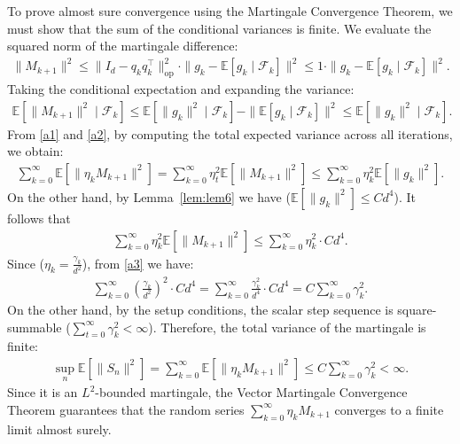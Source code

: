 \documentclass[11pt,a4paper]{article}
\theoremstyle{definition}
\begin{document}
To prove almost sure convergence using the Martingale Convergence Theorem, we must show that the sum of the conditional variances is finite. We evaluate the squared norm of the martingale difference:
\begin{align}
\|M_{k+1}\|^2 \le \|I_d - q_k q_k^\top\|_{\text{op}}^2 \cdot \|g_k - \mathbb{E}[g_k \mid \mathcal{F}_k]\|^2 \le 1 \cdot \|g_k - \mathbb{E}[g_k \mid \mathcal{F}_k]\|^2 \label{a1}.
\end{align}
Taking the conditional expectation and expanding the variance:
\begin{align}
\mathbb{E}[\|M_{k+1}\|^2 \mid \mathcal{F}_k] \le \mathbb{E}[\|g_k\|^2 \mid \mathcal{F}_k] - \|\mathbb{E}[g_k \mid \mathcal{F}_k]\|^2 \le \mathbb{E}[\|g_k\|^2 \mid \mathcal{F}_k] \label{a2}.
\end{align}
From \eqref{a1} and \eqref{a2}, by computing the total expected variance across all iterations, we obtain:
\begin{align}
\sum_{k=0}^{\infty} \mathbb{E}\left[ \|\eta_k M_{k+1}\|^2 \right] = \sum_{k=0}^{\infty} \eta_t^2 \mathbb{E}\left[ \|M_{k+1}\|^2 \right] \le \sum_{k=0}^{\infty} \eta_k^2 \mathbb{E}\left[ \|g_k\|^2 \right].
\end{align}
On the other hand,  by Lemma~\ref{lem:lem6} we have ($\mathbb{E}[\|g_k\|^2] \le C d^4$). It follows that
\begin{align}
\sum_{k=0}^{\infty} \eta_k^2 \mathbb{E}\left[ \|M_{k+1}\|^2 \right] \le \sum_{k=0}^{\infty} \eta_k^2 \cdot C d^4 \label{a3}. 
\end{align}
Since ($\eta_k = \frac{\gamma_k}{d^2}$), from \eqref{a3} we have:
\begin{align}
\sum_{k=0}^{\infty} \left( \frac{\gamma_k}{d^2} \right)^2 \cdot C d^4 = \sum_{k=0}^{\infty} \frac{\gamma_k^2}{d^4} \cdot C d^4 = C \sum_{k=0}^{\infty} \gamma_k^2.
\end{align}
On the other hand, by the setup conditions, the scalar step sequence is square-summable ($\sum_{t=0}^{\infty} \gamma_k^2 < \infty$). Therefore, the total variance of the martingale is finite:
\begin{align}
\sup_n \mathbb{E}[\|S_n\|^2]=\sum_{k=0}^{\infty} \mathbb{E}\left[ \|\eta_k M_{k+1}\|^2 \right] \le C \sum_{k=0}^{\infty} \gamma_k^2 < \infty.
\end{align}
Since it is an $L^2$-bounded martingale, the Vector Martingale Convergence Theorem \cite{Durrett}  guarantees that the random series $\sum_{k=0}^{\infty} \eta_k M_{k+1}$ converges to a finite limit almost surely.
\end{document}
